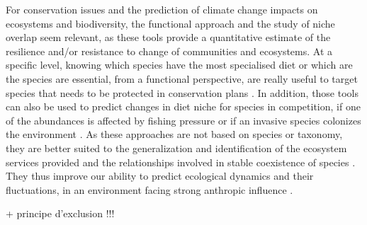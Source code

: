 For conservation issues and the prediction of climate change impacts on ecosystems and biodiversity, the functional approach and the study of niche overlap seem relevant, as these tools provide a quantitative estimate of the resilience and/or resistance to change of communities and ecosystems. 
 At a specific level, knowing which species have the most specialised diet or which are the species are essential, from a functional perspective, are really useful to target species that needs to be protected in conservation plans \citep{mejri2009,norton1995}. In addition, those tools can also be used to predict changes in diet niche for species in competition, if one of the abundances is affected by fishing pressure \citep{diderich2006} or if an invasive species colonizes the environment \citep{albouy2011,geange2011,nagelkerke2018}. As these approaches are not based on species or taxonomy, they are better suited to the generalization and identification of the ecosystem services provided \citep{martini2020,mcgill2006} and the relationships involved in stable coexistence of species \citep{albouy2011}. They thus improve our ability to predict ecological dynamics and their fluctuations, in an environment facing strong anthropic influence \citep{kremer2017}. 

+ principe d'exclusion !!!